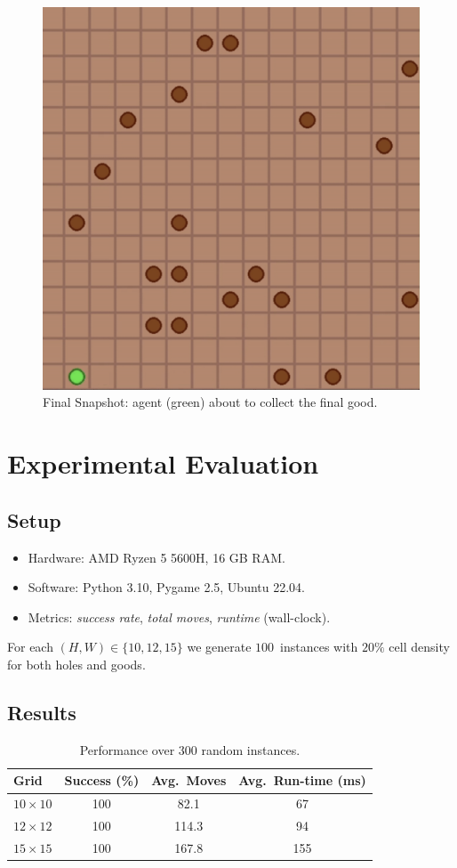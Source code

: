 \documentclass[12pt]{article}
\begin{document}
\begin{figure}[ht]
    \centering
    \includegraphics[width=.55\linewidth]{end.png}
    \caption{Final Snapshot: agent (green) about to collect the final good.}
    \label{fig:snapshot}
\end{figure}

\section{Experimental Evaluation}\label{sec:experiments}
\subsection{Setup}
\begin{itemize}
    \item Hardware: AMD Ryzen 5 5600H, 16 GB RAM.
    \item Software: Python 3.10, Pygame 2.5, Ubuntu 22.04.
    \item Metrics: \emph{success rate}, \emph{total moves},
          \emph{runtime} (wall-clock).
\end{itemize}
For each $(H,W)\in\{10,12,15\}$ we generate
$100$~instances with \(20\%\) cell density for both holes and goods.

\subsection{Results}
\begin{table}[ht]
\centering
\caption{Performance over 300 random instances.}
\begin{tabular}{@{}lccc@{}}
\toprule
Grid & Success (\%) & Avg.\ Moves & Avg.\ Run-time (ms)\\\midrule
$10\times10$ & 100 &  82.1 & 67\\
$12\times12$ & 100 & 114.3 & 94\\
$15\times15$ & 100 & 167.8 & 155\\\bottomrule
\end{tabular}
\label{tab:results}
\end{table}
\end{document}
